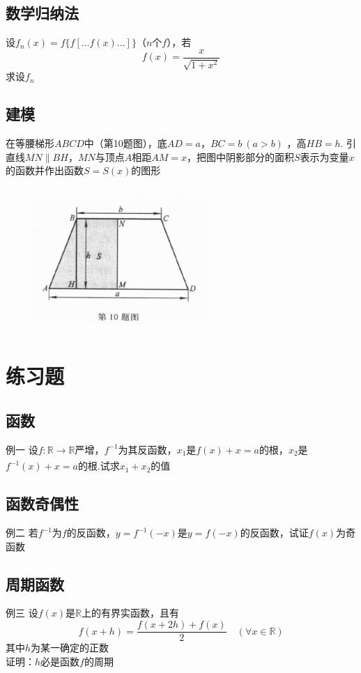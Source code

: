 \documentclass[9pt]{beamer}
\begin{document}
\subsection{数学归纳法}
\begin{frame}{22}{}
设$f_{n}(x)=f\{f[\dots f(x) \dots ]\}$（$n$个$f$），若\\
\begin{equation*}
    f(x)=\dfrac{x}{\sqrt{1+x^2}}
\end{equation*}
求设$f_{n}$
\end{frame}
\subsection{建模}
\begin{frame}{10}{}
在等腰梯形$ABCD$中（第10题图），底$AD=a$，$BC=b\ (a>b)$ ，高$HB=h$. 引直线$MN \parallel BH$，$MN$与顶点$A$相距$AM =x$，把图中阴影部分的面积$S$表示为变量$x$ 的函数并作出函数$S=S(x)$的图形\\
\begin{figure}[h]
\centering
\includegraphics[width=6.5cm,height=5.5cm]{assets/10.png}
\end{figure}
\end{frame}


\section{练习题}
\subsection{函数}
\begin{frame}{例一}{}
设$f:\mathbb{R} \xrightarrow[]{} \mathbb{R}$严增，$f^{-1}$为其反函数，$x_1$是$f(x)+x=a$的根，$x_2$是$f^{-1}(x)+x=a$的根.试求$x_{1}+x_{2}$的值
\end{frame}
\subsection{函数奇偶性}
\begin{frame}{例二}{}
若$f^{-1}$为$f$的反函数，$y=f^{-1}(-x)$是$y=f(-x)$的反函数，试证$f(x)$为奇函数
\end{frame}
\subsection{周期函数}
\begin{frame}{例三}{}
设$f(x)$是$\mathbb{R}$上的有界实函数，且有
\begin{equation*}
    f(x+h)=\dfrac{f(x+2h)+f(x)}{2} \quad (\forall x \in \mathbb{R})
\end{equation*}
其中$h$为某一确定的正数\\
证明：$h$必是函数$f$的周期
\end{frame}
\end{document}
